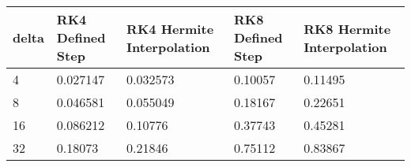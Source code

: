\begin{tabular}{lllll}
delta & RK4 Defined Step & RK4 Hermite Interpolation & RK8 Defined Step & RK8 Hermite Interpolation \\ 
\hline 
4 & 0.027147 & 0.032573 & 0.10057 & 0.11495 \\ 
8 & 0.046581 & 0.055049 & 0.18167 & 0.22651 \\ 
16 & 0.086212 & 0.10776 & 0.37743 & 0.45281 \\ 
32 & 0.18073 & 0.21846 & 0.75112 & 0.83867 \\ 
\hline 
\end{tabular}
